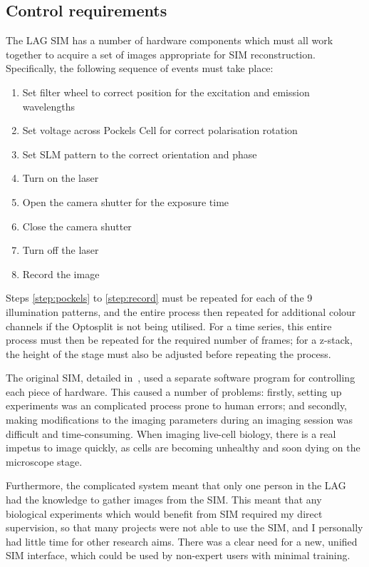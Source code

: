 \subsection{Control requirements} \label{sec:SIMsteps}
The LAG SIM has a number of hardware components which must all work together to acquire a set of images appropriate for SIM reconstruction.
Specifically, the following sequence of events must take place:
\begin{enumerate}
	\item Set filter wheel to correct position for the excitation and emission wavelengths
	\item\label{step:pockels} Set voltage across Pockels Cell for correct polarisation rotation
	\item Set SLM pattern to the correct orientation and phase
	\item Turn on the laser
	\item Open the camera shutter for the exposure time
	\item Close the camera shutter
	\item Turn off the laser
	\item\label{step:record} Record the image
\end{enumerate}
Steps \ref{step:pockels} to \ref{step:record} must be repeated for each of the 9 illumination patterns, and the entire process then repeated for additional colour channels if the Optosplit is not being utilised. 
For a time series, this entire process must then be repeated for the required number of frames; for a z-stack, the height of the stage must also be adjusted before repeating the process. 

The original SIM, detailed in~\cite{young2016guide}, used a separate software program for controlling each piece of hardware. 
This caused a number of problems: firstly, setting up experiments was an complicated process prone to human errors; and secondly, making modifications to the imaging parameters during an imaging session was difficult and time-consuming. 
When imaging live-cell biology, there is a real impetus to image quickly, as cells are becoming unhealthy and soon dying on the microscope stage. 

Furthermore, the complicated system meant that only one person in the LAG had the knowledge to gather images from the SIM. 
This meant that any biological experiments which would benefit from SIM required my direct supervision, so that many projects were not able to use the SIM, and I personally had little time for other research aims.
There was a clear need for a new, unified SIM interface, which could be used by non-expert users with minimal training. 

